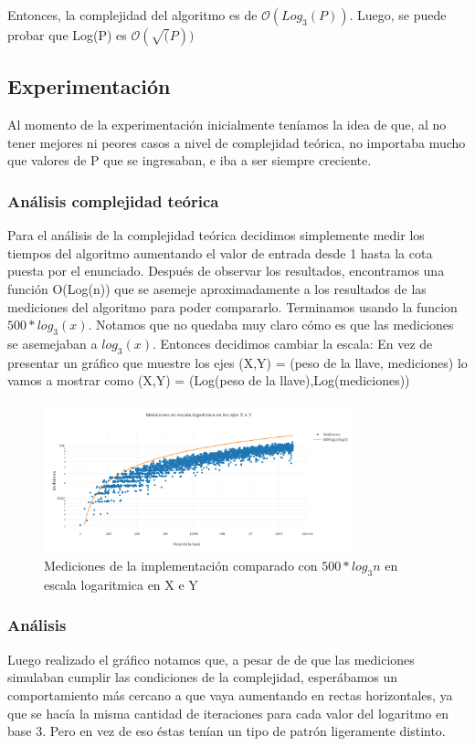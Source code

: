 \documentclass[spanish,12pt]{article}
\begin{document}
{Entonces, la complejidad del algoritmo es de $\mathcal{O}(Log_{3}(P))$.
Luego, se puede probar que Log(P) es $\mathcal{O}(\sqrt(P))$


\subsection{Experimentación}
 Al momento de la experimentación inicialmente teníamos la idea de que, al no tener mejores ni peores casos a nivel de complejidad teórica, no importaba mucho que valores de P que se ingresaban, e iba a ser siempre creciente.

\subsubsection{Análisis complejidad te\'orica}
 Para el análisis de la complejidad te\'orica decidimos simplemente medir los tiempos del algoritmo aumentando el valor de entrada desde 1 hasta la cota puesta por el enunciado.
  Después de observar los resultados, encontramos una función O(Log(n)) que se asemeje aproximadamente a los resultados de las mediciones del algoritmo para poder compararlo.
  Terminamos usando la funcion $500*log_3(x)$.
  Notamos que no quedaba muy claro cómo es que las mediciones se asemejaban a $log_3(x)$. Entonces decidimos cambiar la escala:
  En vez de presentar un gráfico que muestre los ejes (X,Y) = (peso de la llave, mediciones) lo vamos a mostrar como (X,Y) = (Log(peso de la llave),Log(mediciones))

	\begin{figure}[H]
	\centering
	\includegraphics[width=0.8\textwidth]{punto2-mediciones}
	\caption{Mediciones de la implementaci\'on comparado con $500*log_{3}{n}$ en escala logaritmica en X e Y}
	\end{figure}



\subsubsection{Análisis}
Luego realizado el gráfico notamos que, a pesar de de que las mediciones simulaban cumplir las condiciones de la complejidad, esperábamos un comportamiento más cercano a que vaya aumentando en rectas horizontales, ya que se hacía la misma cantidad de iteraciones para cada valor del logaritmo en base 3. Pero en vez de eso éstas tenían un tipo de patrón ligeramente distinto.

}
\end{document}
